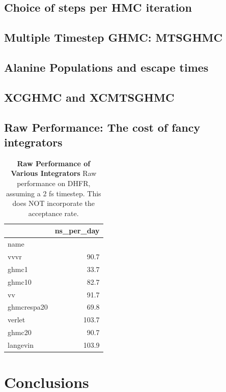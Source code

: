 \documentclass[aps,pre,twocolumn,nofootinbib,superscriptaddress,linenumbers]{revtex4-1}
\begin{document}
\subsection{Choice of steps per HMC iteration}

\subsection{Multiple Timestep GHMC: MTSGHMC}

\subsection{Alanine Populations and escape times}

\subsection{XCGHMC and XCMTSGHMC}

\subsection{Raw Performance: The cost of fancy integrators}

\begin{table}
\begin{tabular}{lr}
\toprule
{} & ns\_per\_day \\
\midrule
name        &            \\
vvvr        &       90.7 \\
ghmc1       &       33.7 \\
ghmc10      &       82.7 \\
vv          &       91.7 \\
ghmcrespa20 &       69.8 \\
verlet      &      103.7 \\
ghmc20      &       90.7 \\
langevin    &      103.9 \\
\bottomrule
\end{tabular}
\caption{{\bf Raw Performance of Various Integrators}
Raw performance on DHFR, assuming a 2 fs timestep. This does NOT incorporate the acceptance rate.
}
\label{table:ThermoMLSummary}
\end{table}





\section{Conclusions}
\end{document}
